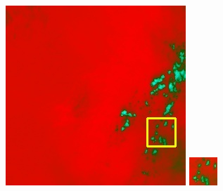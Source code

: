 \documentclass[10pt,UTF8,fntef]{ctexart}
\begin{document}
\begin{figure}[H]
{{\begin{minipage}[b]{0.15\linewidth}
            \includegraphics[width=1\linewidth]{../log/spoon3/cut/LC81570452014213LGN00_06142_spectral.jpg}\vspace{4pt}
            \includegraphics[width=1\linewidth]{../log/spoon3/cut/tmp_cut_LC81570452014213LGN00_06142_spectral.jpg}\vspace{4pt}

\end{minipage}}}
\end{figure}
\end{document}
